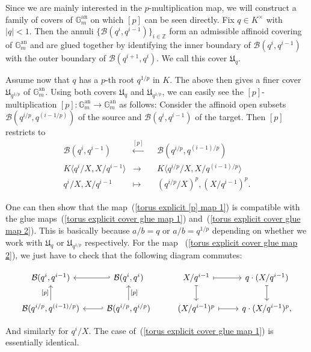\documentclass[10pt,oneside]{amsart}
\theoremstyle{definition}
\begin{document}
	Since we are mainly interested in the $p$-multiplication map, we will construct a family of covers of $\mathbb G_m^{\operatorname{an}}$ on which $[p]$ can be seen directly. Fix $q \in K^\times$ with $|q|< 1$. Then the annuli $\{\mathcal B(q^i,q^{i-1})\}_{i\in\mathbb{Z}}$ form an admissible affinoid covering of $\mathbb G_m^{\operatorname{an}}$ and are glued together by identifying the inner boundary of $\mathcal B(q^i, q^{i-1})$ with the outer boundary of $\mathcal B(q^{i+1},q^i)$. We call this cover $\mathfrak U_q$. 

	Assume now that $q$ has a $p$-th root $q^{1/p}$ in $K$. The above then gives a finer cover $\mathfrak U_{q^{1/p}}$ of $\mathbb G_m^{\operatorname{an}}$. Using both covers $\mathfrak U_q$ and $\mathfrak U_{q^{1/p}}$, we can easily see the $[p]$-multiplication $[p]:\mathbb G_m^{\operatorname{an}}\rightarrow \mathbb G_m^{\operatorname{an}}$ as follows: Consider the affinoid open subsets $\mathcal B(q^{i/p},q^{(i-1/p)})$ of the source and  $\mathcal B(q^i,q^{i-1})$ of the target. Then $[p]$ restricts to
	\begin{equation}
	\begin{alignedat}{2} \label{torus explicit [p] map 1}
	\mathcal B(q^i,q^{i-1})&\xleftarrow{[p]}&& \mathcal B(q^{i/p},q^{(i-1)/p})\\
	K\langle q^i/X,X/q^{i-1}\rangle&\rightarrow &&K\langle q^{i/p}/X, X/q^{(i-1)/p}\rangle\\
	q^i/X, X/q^{i-1}&\mapsto&& (q^{i/p}/X)^p, (X/q^{i-1})^p.
	\end{alignedat}
	\end{equation}

	One can then show that the map~(\ref{torus explicit [p] map 1}) is compatible with the glue maps~(\ref{torus explicit cover glue map 1}) and~(\ref{torus explicit cover glue map 2}). This is basically because $a/b=q$ or $a/b=q^{1/p}$ depending on whether we work with $\mathfrak U_q$ or $\mathfrak U_{q^{1/p}}$ respectively. For the map ~(\ref{torus explicit cover glue map 2}), we just have to check that the following diagram commutes:
	\begin{center}
		\begin{equation}\label{diagram showing that [p]-multiplication on torus glues together}
		\begin{tikzcd}
			\mathcal B(q^i,q^{i-1}) & \mathcal B(q^i,q^i) \arrow[l, hook'] & X/q^{i-1} \arrow[r, maps to] \arrow[d, maps to] & q\cdot (X/q^{i-1})\arrow[d, maps to] \\
			\mathcal B(q^{i/p},q^{(i-1)/p}) \arrow[u, "{[p]}"] & \mathcal B(q^{i/p},q^{i/p}) \arrow[u, "{[p]}"'] \arrow[l, hook'] & (X/q^{i-1})^p \arrow[r, maps to] & q\cdot (X/q^{i-1})^p,
		\end{tikzcd}
		\end{equation}
	\end{center} 
	And similarly for $q^i/X$. The case of~(\ref{torus explicit cover glue map 1}) is essentially identical.
	
\end{document}
